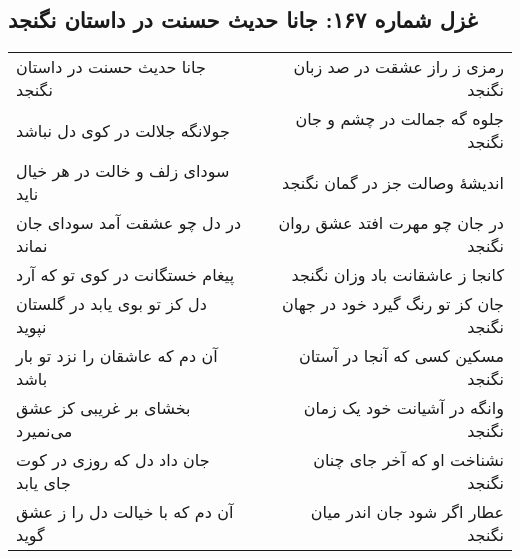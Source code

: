 \begin{center}
\section*{غزل شماره ۱۶۷: جانا حدیث حسنت در داستان نگنجد}
\label{sec:167}
\begin{longtable}{l p{0.5cm} r}
جانا حدیث حسنت در داستان نگنجد
&&
رمزی ز راز عشقت در صد زبان نگنجد
\\
جولانگه جلالت در کوی دل نباشد
&&
جلوه گه جمالت در چشم و جان نگنجد
\\
سودای زلف و خالت در هر خیال ناید
&&
اندیشهٔ وصالت جز در گمان نگنجد
\\
در دل چو عشقت آمد سودای جان نماند
&&
در جان چو مهرت افتد عشق روان نگنجد
\\
پیغام خستگانت در کوی تو که آرد
&&
کانجا ز عاشقانت باد وزان نگنجد
\\
دل کز تو بوی یابد در گلستان نپوید
&&
جان کز تو رنگ گیرد خود در جهان نگنجد
\\
آن دم که عاشقان را نزد تو بار باشد
&&
مسکین کسی که آنجا در آستان نگنجد
\\
بخشای بر غریبی کز عشق می‌نمیرد
&&
وانگه در آشیانت خود یک زمان نگنجد
\\
جان داد دل که روزی در کوت جای یابد
&&
نشناخت او که آخر جای چنان نگنجد
\\
آن دم که با خیالت دل را ز عشق گوید
&&
عطار اگر شود جان اندر میان نگنجد
\\
\end{longtable}
\end{center}
